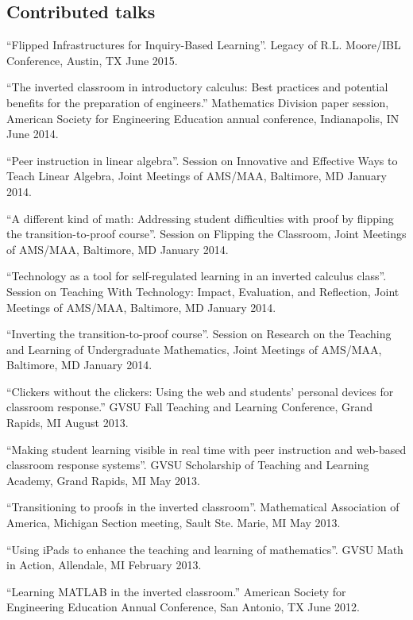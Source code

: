 \documentclass[letterpaper]{article}
\renewenvironment{itemize}{
  \begin{list}{}{
    \setlength{\leftmargin}{1.5em}
	\setlength{\itemsep}{0in}
  }
}{
  \end{list}
}
\begin{document}
\subsection*{Contributed talks}

\begin{itemize}
	\item ``Flipped Infrastructures for Inquiry-Based Learning''. Legacy of R.L. Moore/IBL Conference, Austin, TX June 2015.
	\item ``The inverted classroom in introductory calculus: Best practices and potential benefits for the preparation of engineers.'' Mathematics Division paper session, American Society for Engineering Education annual conference, Indianapolis, IN June 2014. 
	\item ``Peer instruction in linear algebra''. Session on Innovative and Effective Ways to Teach Linear Algebra, Joint Meetings of AMS/MAA, Baltimore, MD January 2014. 
	\item ``A different kind of math: Addressing student difficulties with proof by flipping the transition-to-proof course''. Session on Flipping the Classroom, Joint Meetings of AMS/MAA, Baltimore, MD January 2014.
	\item ``Technology as a tool for self-regulated learning in an inverted calculus class''. Session on Teaching With Technology: Impact, Evaluation, and Reflection, Joint Meetings of AMS/MAA, Baltimore, MD January 2014.
	\item ``Inverting the transition-to-proof course''. Session on Research on the Teaching and Learning of Undergraduate Mathematics, Joint Meetings of AMS/MAA, Baltimore, MD January 2014.
	\item ``Clickers without the clickers: Using the web and students' personal devices for classroom response.'' GVSU Fall Teaching and Learning Conference, Grand Rapids, MI August 2013. 
	\item ``Making student learning visible in real time with peer instruction and web-based classroom response systems''. GVSU Scholarship of Teaching and Learning Academy, Grand Rapids, MI May 2013. 
	\item ``Transitioning to proofs in the inverted classroom''. Mathematical Association of America, Michigan Section meeting, Sault Ste. Marie, MI May 2013. 
	\item ``Using iPads to enhance the teaching and learning of mathematics''. GVSU Math in Action, Allendale, MI February 2013. 
	\item ``Learning MATLAB in the inverted classroom.'' American Society for Engineering Education Annual Conference, San Antonio, TX June 2012. 

\end{itemize}
\end{document}
